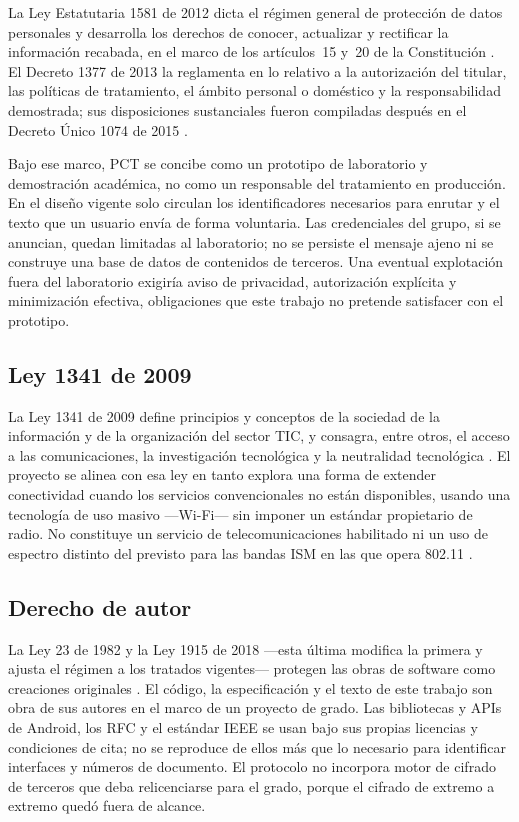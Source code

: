 \documentclass[12pt,oneside]{scrreprt}
\begin{document}
La Ley Estatutaria 1581 de 2012 dicta el régimen general de protección de datos personales y desarrolla los derechos de conocer, actualizar y rectificar la información recabada, en el marco de los artículos~15 y~20 de la Constitución \parencite{CongresoRepublica2012a}. El Decreto 1377 de 2013 la reglamenta en lo relativo a la autorización del titular, las políticas de tratamiento, el ámbito personal o doméstico y la responsabilidad demostrada; sus disposiciones sustanciales fueron compiladas después en el Decreto Único 1074 de 2015 \parencite{Presidencia2013}.

Bajo ese marco, PCT se concibe como un prototipo de laboratorio y demostración académica, no como un responsable del tratamiento en producción. En el diseño vigente solo circulan los identificadores necesarios para enrutar y el texto que un usuario envía de forma voluntaria. Las credenciales del grupo, si se anuncian, quedan limitadas al laboratorio; no se persiste el mensaje ajeno ni se construye una base de datos de contenidos de terceros. Una eventual explotación fuera del laboratorio exigiría aviso de privacidad, autorización explícita y minimización efectiva, obligaciones que este trabajo no pretende satisfacer con el prototipo.

\subsection{Ley 1341 de 2009}

La Ley 1341 de 2009 define principios y conceptos de la sociedad de la información y de la organización del sector TIC, y consagra, entre otros, el acceso a las comunicaciones, la investigación tecnológica y la neutralidad tecnológica \parencite{CongresoRepublica2009}. El proyecto se alinea con esa ley en tanto explora una forma de extender conectividad cuando los servicios convencionales no están disponibles, usando una tecnología de uso masivo ---Wi-Fi--- sin imponer un estándar propietario de radio. No constituye un servicio de telecomunicaciones habilitado ni un uso de espectro distinto del previsto para las bandas ISM en las que opera 802.11 \parencite{IEEE2020}.

\subsection{Derecho de autor}

La Ley 23 de 1982 y la Ley 1915 de 2018 ---esta última modifica la primera y ajusta el régimen a los tratados vigentes--- protegen las obras de software como creaciones originales \parencite{CongresoRepublica1982,CongresoRepublica2018}. El código, la especificación y el texto de este trabajo son obra de sus autores en el marco de un proyecto de grado. Las bibliotecas y APIs de Android, los RFC y el estándar IEEE se usan bajo sus propias licencias y condiciones de cita; no se reproduce de ellos más que lo necesario para identificar interfaces y números de documento. El protocolo no incorpora motor de cifrado de terceros que deba relicenciarse para el grado, porque el cifrado de extremo a extremo quedó fuera de alcance.
\end{document}
